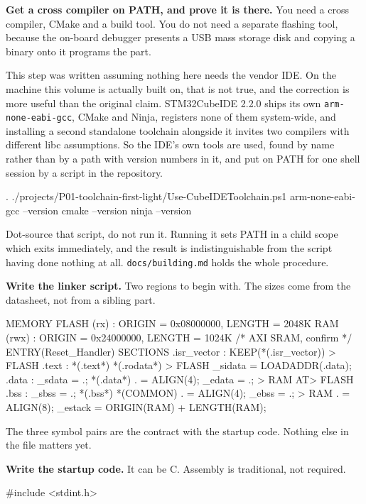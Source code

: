 \begin{steps}
\item \textbf{Get a cross compiler on PATH, and prove it is there.} You need a
cross compiler, CMake and a build tool. You do not need a separate flashing tool,
because the on-board debugger presents a USB mass storage disk and copying a
binary onto it programs the part.

This step was written assuming nothing here needs the vendor IDE. On the machine
this volume is actually built on, that is not true, and the correction is more
useful than the original claim. STM32CubeIDE 2.2.0 ships its own
\texttt{arm-none-eabi-gcc}, CMake and Ninja, registers none of them system-wide,
and installing a second standalone toolchain alongside it invites two compilers
with different libc assumptions. So the IDE's own tools are used, found by name
rather than by a path with version numbers in it, and put on PATH for one shell
session by a script in the repository.
\begin{shellcode}
. ./projects/P01-toolchain-first-light/Use-CubeIDEToolchain.ps1
arm-none-eabi-gcc --version
cmake --version
ninja --version
\end{shellcode}
Dot-source that script, do not run it. Running it sets PATH in a child scope which
exits immediately, and the result is indistinguishable from the script having done
nothing at all. \texttt{docs/building.md} holds the whole procedure.

\item \textbf{Write the linker script.} Two regions to begin with. The sizes
come from the datasheet, not from a sibling part.
\begin{ldcode}
MEMORY
{
  FLASH (rx) : ORIGIN = 0x08000000, LENGTH = 2048K
  RAM  (rwx) : ORIGIN = 0x24000000, LENGTH = 1024K   /* AXI SRAM, confirm */
}
ENTRY(Reset_Handler)
SECTIONS
{
  .isr_vector : { KEEP(*(.isr_vector)) } > FLASH
  .text   : { *(.text*) *(.rodata*) } > FLASH
  _sidata = LOADADDR(.data);
  .data   : { _sdata = .; *(.data*) . = ALIGN(4); _edata = .; } > RAM AT> FLASH
  .bss    : { _sbss = .; *(.bss*) *(COMMON) . = ALIGN(4); _ebss = .; } > RAM
  . = ALIGN(8);
  _estack = ORIGIN(RAM) + LENGTH(RAM);
}
\end{ldcode}
The three symbol pairs are the contract with the startup code. Nothing else in
the file matters yet.

\item \textbf{Write the startup code.} It can be C. Assembly is traditional, not
required.
\begin{ccode}
#include <stdint.h>


\end{ccode}
\end{steps}
